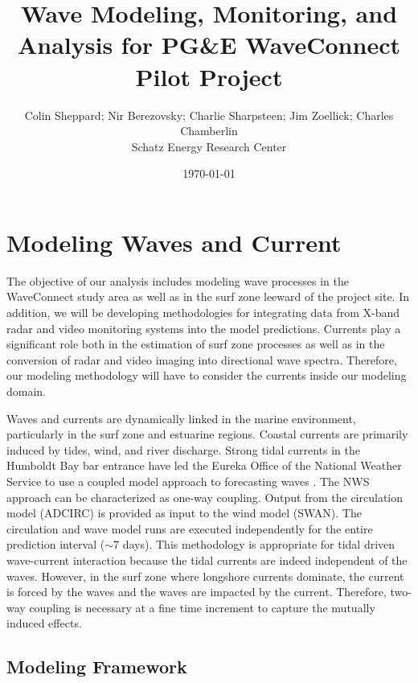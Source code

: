 \documentclass[11pt,letterpaper,oneside,reqno]{article}
\title{\bf Wave Modeling, Monitoring, and Analysis for PG\&E WaveConnect Pilot Project}
\author{Colin Sheppard; Nir Berezovsky; Charlie Sharpsteen; Jim Zoellick; Charles Chamberlin\\Schatz Energy Research Center}
\date{\today}
\begin{document}
\maketitle

\section{Modeling Waves and Current}

The objective of our analysis includes modeling wave processes in
the WaveConnect study area as well as in the surf zone leeward of
the project site. In addition, we will be developing methodologies
for integrating data from X-band radar and video monitoring systems
into the model predictions. Currents play a significant role both
in the estimation of surf zone processes as well as in the
conversion of radar and video imaging into directional wave
spectra. Therefore, our modeling methodology will have to consider
the currents inside our modeling domain.

Waves and currents are dynamically linked in the marine
environment, particularly in the surf zone and estuarine regions.
Coastal currents are primarily induced by tides, wind, and river
discharge. Strong tidal currents in the Humboldt Bay bar entrance
have led the Eureka Office of the National Weather Service to use a
coupled model approach to forecasting waves \citep{nicolini2005}. The NWS
approach can be characterized as one-way coupling. Output from the
circulation model (ADCIRC) is provided as input to the wind model
(SWAN). The circulation and wave model runs are executed
independently for the entire prediction interval
(\ensuremath{\sim}7 days). This methodology is appropriate for
tidal driven wave-current interaction because the tidal currents
are indeed independent of the waves. However, in the surf zone
where longshore currents dominate, the current is forced by the
waves and the waves are impacted by the current. Therefore, two-way
coupling is necessary at a fine time increment to capture the
mutually induced effects.

\subsection{Modeling Framework}
\end{document}
